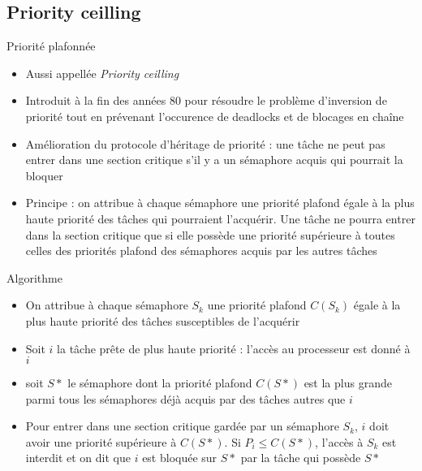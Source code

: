 \subsection{Priority ceilling}

\begin{frame}{Priorité plafonnée}
  \begin{itemize} 
  \item Aussi appellée \emph{Priority ceilling}
  \item Introduit  à la  fin des années  80 pour résoudre  le problème
    d'inversion de priorité tout en prévenant l'occurence de deadlocks
    et de blocages en chaîne
  \item Amélioration  du protocole d'héritage de priorité  : une tâche
    ne peut pas entrer dans une section critique s'il y a un sémaphore
    acquis qui pourrait la bloquer
  \item Principe : on attribue à chaque sémaphore une priorité plafond
    égale  à  la  plus   haute  priorité  des  tâches  qui  pourraient
    l'acquérir. Une  tâche ne pourra  entrer dans la  section critique
    que si  elle possède une  priorité supérieure à toutes  celles des
    priorités plafond des sémaphores acquis par les autres tâches
  \end{itemize} 
\end{frame} 

\begin{frame}{Algorithme}
  \begin{itemize} 
  \item  On attribue  à chaque  sémaphore $S_k$  une  priorité plafond
    $C(S_k)$ égale à la plus haute priorité des tâches susceptibles de
    l'acquérir
  \item Soit $i$  la tâche prête de plus  haute priorité : l'accès
    au processeur est donné à $i$
  \item soit $S*$ le sémaphore dont la priorité plafond $C(S*)$ est la
    plus grande parmi  tous les sémaphores déjà acquis  par des tâches
    autres que $i$
  \item Pour entrer dans une  section critique gardée par un sémaphore
    $S_k$, $i$ doit avoir une  priorité supérieure à $C(S*)$. Si $P_i
    ≤ C(S*)$,  l'accès à $S_k$  est interdit et  on dit que  $i$ est
    bloquée sur $S*$ par la tâche qui possède $S*$
  \end{itemize} 
\end{frame} 

